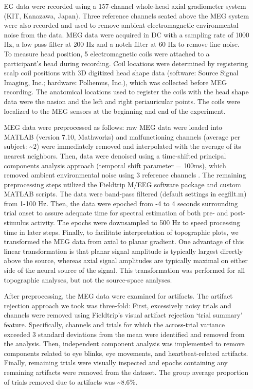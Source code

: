 EG data were recorded using a 157-channel whole-head axial gradiometer
system (KIT, Kanazawa, Japan). Three reference channels seated above the
MEG system were also recorded and used to remove ambient electromagnetic
environmental noise from the data. MEG data were acquired in DC with a
sampling rate of 1000 Hz, a low pass filter at 200 Hz and a notch filter
at 60 Hz to remove line noise. To measure head position, 5
electromagnetic coils were attached to a participant's head during
recording. Coil locations were determined by registering scalp coil
positions with 3D digitized head shape data (software: Source Signal
Imaging, Inc.; hardware: Polhemus, Inc.), which was collected before MEG
recording. The anatomical locations used to register the coils with the
head shape data were the nasion and the left and right periauricular
points. The coils were localized to the MEG sensors at the beginning and
end of the experiment.

MEG data were preprocessed as follows: raw MEG data were loaded into
MATLAB (version 7.10, Mathworks) and malfunctioning channels (average
per subject: \textasciitilde{}2) were immediately removed and
interpolated with the average of its nearest neighbors. Then, data were
denoised using a time-shifted principal components analysis approach
(temporal shift parameter = 100ms), which removed ambient environmental
noise using 3 reference channels \autocite{de_cheveigne_denoising_2007}.
The remaining preprocessing steps utilized the Fieldtrip M/EEG software
package \autocite{oostenveld_fieldtrip:_2010} and custom MATLAB scripts.
The data were band-pass filtered (default settings in eegfilt.m) from
1-100 Hz. Then, the data were epoched from -4 to 4 seconds surrounding
trial onset to assure adequate time for spectral estimation of both pre-
and post-stimulus activity. The epochs were downsampled to 500 Hz to
speed processing time in later steps. Finally, to facilitate
interpretation of topographic plots, we transformed the MEG data from
axial to planar gradient. One advantage of this linear transformation is
that planar signal amplitude is typically largest directly above the
source, whereas axial signal amplitudes are typically maximal on either
side of the neural source of the signal. This transformation was
performed for all topographic analyses, but not the source-space
analyses.

After preprocessing, the MEG data were examined for artifacts. The
artifact rejection approach we took was three-fold: First, excessively
noisy trials and channels were removed using Fieldtrip's visual artifact
rejection `trial summary' feature. Specifically, channels and trials for
which the across-trial variance exceeded 3 standard deviations from the
mean were identified and removed from the analysis. Then, independent
component analysis was implemented to remove components related to eye
blinks, eye movements, and heartbeat-related artifacts. Finally,
remaining trials were visually inspected and epochs containing any
remaining artifacts were removed from the dataset. The group average
proportion of trials removed due to artifacts was
\textasciitilde{}8.6\%.

